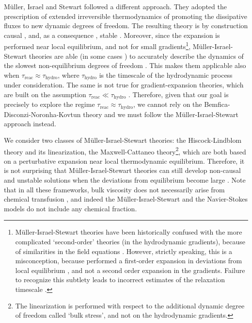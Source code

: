 \documentclass[aps,prd,twocolumn,a4paper,floatfix,nofootbib,superscriptaddress,nofootinbib]{revtex4}
\begin{document}
M\"uller, Israel and Stewart \citep{Israel79, Israel_Stewart_1979} followed a
different approach. They adopted the prescription of extended irreversible
thermodynamics \citep{Jou_Extended, Frontiers_2021} of promoting the
dissipative fluxes to new dynamic degrees of freedom.  The resulting theory is
by construction causal \citep{Hiscock1983}, and, as a consequence
\cite{GavassinoSuperluminal2021}, stable
\citep{GavassinoLyapunov2020,GavassinoStabCarter2022}. Moreover, since the
expansion is performed near local equilibrium, and not for small
gradients\footnote{M\"uller-Israel-Stewart theories have been historically
confused with the more complicated `second-order' theories (in the hydrodynamic
gradients), because of similarities in the field equations
\cite{BaierRom2008}. However, strictly speaking, this is a misconception,
because \citet{Israel_Stewart_1979} performed a first-order expansion in
deviations from local equilibrium \cite{superbulk_PRD_2022}, and not a second
order expansion in the gradients. Failure to recognize this subtlety leads to
incorrect estimates of the relaxation timescale \cite{NoronhaOrigin2011}.},
M\"uller-Israel-Stewart theories are able (in some cases \cite{Heller2014}) to
accurately describe the dynamics of the slowest non-equilibrium degrees of
freedom \cite{Grozdanov2019,superbulk_PRD_2022}. This makes them applicable
also when $\tau_\mathrm{reac} \approx \tau_\mathrm{hydro}$, where
$\tau_\mathrm{hydro}$ is the timescale of the hydrodynamic process under
consideration. The same is not true for gradient-expansion theories, which are
built on the assumption $\tau_\mathrm{reac} \ll \tau_\mathrm{hydro}$
\cite{Kovtun19}. Therefore, given that our goal is precisely to explore the
regime $\tau_\mathrm{reac} \approx \tau_\mathrm{hydro}$, we cannot rely on the
Bemfica-Disconzi-Noronha-Kovtun theory \cite{Bemfica22, Kovtun19} and we must
follow the M\"uller-Israel-Stewart approach instead. 

  We consider two classes of M\"uller-Israel-Stewart theories: the
Hiscock-Lindblom theory \citep{Hiscock1983} and its linearization, the
Maxwell-Cattaneo \cite{Zakari93} theory\footnote{The linearization is performed with respect to
the additional dynamic degree of freedom called `bulk stress', and not on the
hydrodynamic gradients.}, which are both based on a perturbative expansion near local thermodynamic
equilibrium. Therefore, it is not surprising that M\"uller-Israel-Stewart
theories can still develop non-causal and unstable solutions when the
deviations from equilibrium become large \citep{Hiscock1983, Hiscock91,
Zakari93, Maartens95, GavassinoLyapunov2020}. Note that in all these frameworks, bulk viscosity does not necessarily arise from chemical
transfusion \cite{UdeyRadiation1982}, and indeed the M\"uller-Israel-Stewart and the Navier-Stokes models do not include any
chemical fraction.
\end{document}
